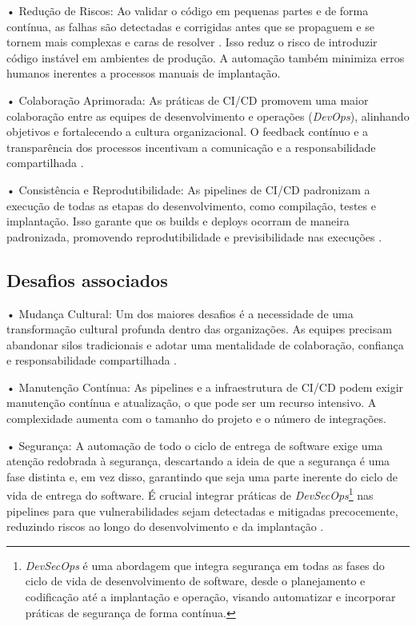 • Redução de Riscos: Ao validar o código em pequenas partes e de forma contínua, as falhas são detectadas e corrigidas antes que se propaguem e se tornem mais complexas e caras de resolver \cite{Fowler2024}. Isso reduz o risco de introduzir código instável em ambientes de produção. A automação também minimiza erros humanos inerentes a processos manuais de implantação.

• Colaboração Aprimorada: As práticas de CI/CD promovem uma maior colaboração entre as equipes de desenvolvimento e operações (\textit{DevOps}), alinhando objetivos e fortalecendo a cultura organizacional. O feedback contínuo e a transparência dos processos incentivam a comunicação e a responsabilidade compartilhada \cite{RedHat2025}.

• Consistência e Reprodutibilidade: As pipelines de CI/CD padronizam a execução de todas as etapas do desenvolvimento, como compilação, testes e implantação. Isso garante que os builds e deploys ocorram de maneira padronizada, promovendo reprodutibilidade e previsibilidade nas execuções \cite{Humble2010}.

\subsection{Desafios associados}

• Mudança Cultural: Um dos maiores desafios é a necessidade de uma transformação cultural profunda dentro das organizações. As equipes precisam abandonar silos tradicionais e adotar uma mentalidade de colaboração, confiança e responsabilidade compartilhada \cite{Samantha2018}.

• Manutenção Contínua: As pipelines e a infraestrutura de CI/CD podem exigir manutenção contínua e atualização, o que pode ser um recurso intensivo. A complexidade aumenta com o tamanho do projeto e o número de integrações.

• Segurança: A automação de todo o ciclo de entrega de software exige uma atenção redobrada à segurança, descartando a ideia de que a segurança é uma fase distinta e, em vez disso, garantindo que seja uma parte inerente do ciclo de vida de entrega do software. É crucial integrar práticas de \textit{DevSecOps}\footnote{\textit{DevSecOps} é uma abordagem que integra segurança em todas as fases do ciclo de vida de desenvolvimento de software, desde o planejamento e codificação até a implantação e operação, visando automatizar e incorporar práticas de segurança de forma contínua.} nas pipelines para que vulnerabilidades sejam detectadas e mitigadas precocemente, reduzindo riscos ao longo do desenvolvimento e da implantação \cite{PaloAltoNetworksCICDSecurity}.


